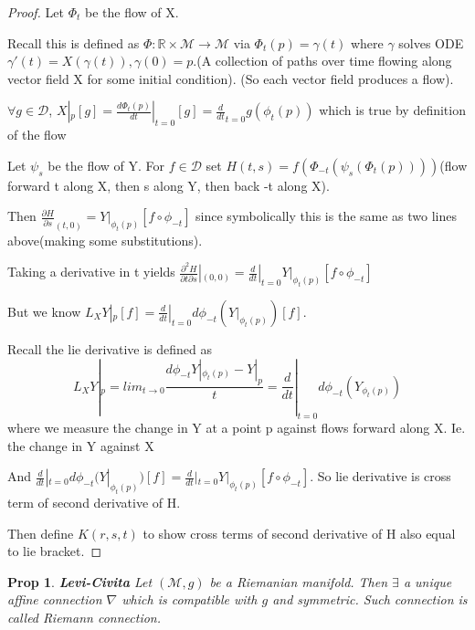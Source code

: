 \documentclass[11pt]{article}
\newcommand{\R}{\mathbb{R}}
\newcommand{\m}{\mathcal{M}}
\newcommand{\dD}{\mathcal{D}}
\newtheorem{prop}{Prop}
\begin{document}
\begin{proof}

	Let $\Phi_t$ be the flow of X. 

	Recall this is defined as $\Phi: \R \times \m \to \m$ via $\Phi_t(p) = \gamma(t)$ where $\gamma$ solves ODE $\gamma'(t) = X(\gamma(t)), \gamma(0) = p$.(A collection of paths over time flowing along vector field X for some initial condition). (So each vector field produces a flow).

	$\forall g \in \dD$, $X|_p[g] = \frac{d\Phi_t(p)}{dt}|_{t=0}[g] = \frac{d}{dt}_{t=0}g(\phi_t(p))$ which is true by definition of the flow

	Let $\psi_s$ be the flow of Y. For $f \in \dD$ set $H(t,s) = f(\Phi_{-t}(\psi_s(\Phi_t(p))))$(flow forward t along X, then s along Y, then back -t along X). 

	Then $\frac{\partial H}{\partial s}_{(t,0)} = Y|_{\phi_t(p)} [f \circ \phi_{-t}]$ since symbolically this is the same as two lines above(making some substitutions).

	Taking a derivative in t yields $\frac{\partial^2 H}{\partial t \partial s}|_{(0,0)} = \frac{d}{dt}|_{t=0} Y|_{\phi_t(p)}[f \circ \phi_{-t}]$

	But we know $L_XY|_p[f] = \frac{d}{dt}|_{t=0} d\phi_{-t}(Y|_{\phi_t(p)})[f]$.

	Recall the lie derivative is defined as 
	\[
		L_X Y|_p = lim_{t\to 0} \frac{d\phi_{-t} Y|_{\phi_t(p)}-Y|_p}{t} = \frac{d}{dt}|_{t=0}d\phi_{-t}(Y_{\phi_t(p)})
	\]
	where we measure the change in Y at a point p against flows forward along X. Ie. the change in Y against X

	And $\frac{d}{dt}|_{t=0} d\phi_{-t}(Y|_{\phi_t(p)})[f] = \frac{d}{dt}|_{t=0} Y|_{\phi_t(p)}[f \circ \phi_{-t}]$. So lie derivative is cross term of second derivative of H.

	Then define $K(r,s,t)$ to show cross terms of second derivative of H also equal to lie bracket. 

\end{proof}


\begin{prop}\textbf{Levi-Civita}
	Let $(\m,g)$ be a Riemanian manifold. Then $\exists$ a unique affine connection $\nabla$ which is compatible with $g$ and symmetric. Such connection is called Riemann connection.
\end{prop}
\end{document}
